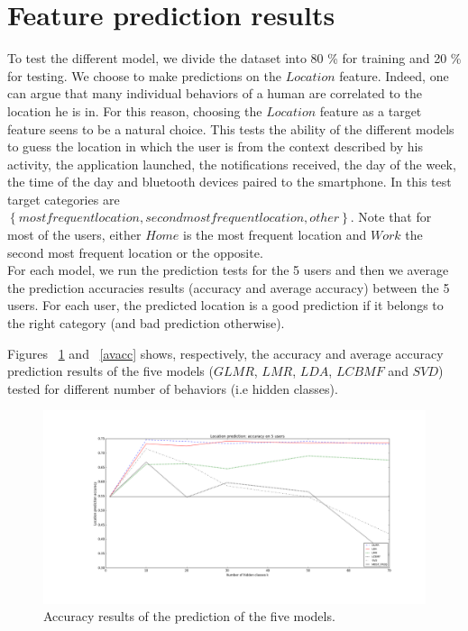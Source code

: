 \section{Feature prediction results}
To test the different model, we divide the dataset into 80 \% for training and 20 \% for testing. We choose to make predictions on the $Location$ feature. Indeed, one can argue that many individual behaviors of a human are correlated to the location he is in. For this reason, choosing the $Location$ feature as a target feature seens to be a natural choice. This tests the ability of the different models to guess the location in which the user is from the context described by his activity, the application launched, the notifications received, the day of the week, the time of the day and bluetooth devices paired to the smartphone. In this test target categories are $\left \{  most frequent location, second most frequent location, other\right \}$. 
Note that for most of the users, either $Home$ is the most frequent location and $Work$ the second most frequent location or the opposite.
\\For each model, we run the prediction tests for the 5 users and then we average the prediction accuracies results (accuracy and average accuracy) between the 5 users. For each user, the predicted location is a good prediction if it belongs to the right category (and bad prediction otherwise).

Figures ~\ref{acc} and ~\ref{avacc} shows, respectively, the accuracy and average accuracy prediction results of the five models ($GLMR$, $LMR$, $LDA$, $LCBMF$ and $SVD$) tested for different number of behaviors (i.e hidden classes).

\begin{figure} [!ht]
\caption{Accuracy results of the prediction of the five models.}
\label{acc}
\includegraphics[scale=0.3]{Figures/location_accuracy.png}
\end{figure}

